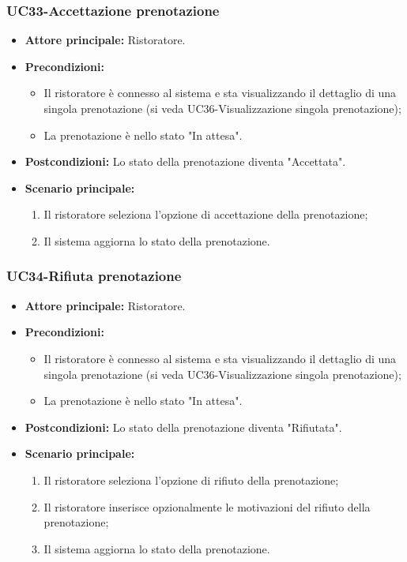 \pagebreak
\subsubsection{UC33-Accettazione prenotazione}
\begin{itemize}
\item \textbf{Attore principale:} Ristoratore.
\item \textbf{Precondizioni:}
\begin{itemize}
        \item Il ristoratore è connesso al sistema e sta visualizzando il dettaglio di una singola prenotazione (si veda UC36-Visualizzazione singola prenotazione);
        \item La prenotazione è nello stato "In attesa".
\end{itemize}
\item \textbf{Postcondizioni:} Lo stato della prenotazione diventa "Accettata".
\item \textbf{Scenario principale:}
\begin{enumerate}
    \item Il ristoratore seleziona l'opzione di accettazione della prenotazione;
    \item Il sistema aggiorna lo stato della prenotazione.
\end{enumerate}
\end{itemize}

\subsubsection{UC34-Rifiuta prenotazione}
\begin{itemize}
\item \textbf{Attore principale:} Ristoratore.
\item \textbf{Precondizioni:}
\begin{itemize}
        \item Il ristoratore è connesso al sistema e sta visualizzando il dettaglio di una singola prenotazione (si veda UC36-Visualizzazione singola prenotazione);
        \item La prenotazione è nello stato "In attesa".
\end{itemize}
\item \textbf{Postcondizioni:} Lo stato della prenotazione diventa "Rifiutata".
\item \textbf{Scenario principale:}
\begin{enumerate}
    \item Il ristoratore seleziona l'opzione di rifiuto della prenotazione;
    \item Il ristoratore inserisce opzionalmente le motivazioni del rifiuto della prenotazione;
    \item Il sistema aggiorna lo stato della prenotazione.
\end{enumerate}
\end{itemize}

